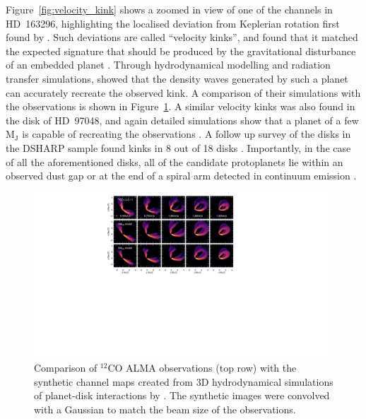 Figure~\ref{fig:velocity_kink} shows a zoomed in view of one of the channels in HD~163296, highlighting the localised deviation from Keplerian rotation first found by \citet{pinte2018a}.
Such deviations are called ``velocity kinks'', and \citet{pinte2018a} found that it matched the expected signature that should be produced by the gravitational disturbance of an embedded planet \citep{perez2015}.
Through hydrodynamical modelling and radiation transfer simulations, \citet{pinte2018a} showed that the density waves generated by such a planet can accurately recreate the observed kink.
A comparison of their simulations with the observations is shown in Figure~\ref{fig:pinte2018_hydro}.
A similar velocity kinks was also found in the disk of HD~97048, and again detailed simulations show that a planet of a few $\mathrm{M_J}$ is capable of recreating the observations \citep{pinte2019}.
A follow up survey of the disks in the DSHARP sample found kinks in 8 out of 18 disks \citep{pinte2020}.
Importantly, in the case of all the aforementioned disks, all of the candidate protoplanets lie within an observed dust gap or at the end of a spiral arm detected in continuum emission \citep{huang2018b,huang2018,pinte2020}.

\begin{figure}
    \centering
    \includegraphics[width = 0.98\textwidth]{figures/pinte_2018_sims_channels.pdf}
    \caption{Comparison of $^{12}$CO ALMA observations (top row) with the synthetic channel maps created from 3D hydrodynamical simulations of planet-disk interactions by \citet{pinte2018a}. The synthetic images were convolved with a Gaussian to match the beam size of the observations.}
    \label{fig:pinte2018_hydro}
\end{figure}


